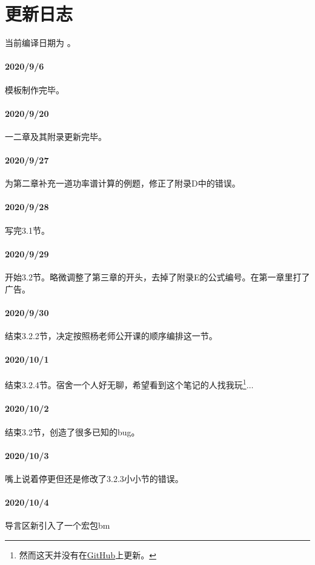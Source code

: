 \section{更新日志}
    当前编译日期为
    。
    \paragraph{2020/9/6}模板制作完毕。
    \paragraph{2020/9/20}一二章及其附录更新完毕。
    \paragraph{2020/9/27}为第二章补充一道功率谱计算的例题，修正了附录D中的错误。
    \paragraph{2020/9/28}写完3.1节。
    \paragraph{2020/9/29}开始3.2节。略微调整了第三章的开头，去掉了附录E的公式编号。在第一章里打了广告。
    \paragraph{2020/9/30}结束3.2.2节，决定按照杨老师公开课的顺序编排这一节。
    \paragraph{2020/10/1}结束3.2.4节。宿舍一个人好无聊，希望看到这个笔记的人找我玩\footnote{然而这天并没有在\href{https://github.com/phydx0803/BuptPoCNoteBook/}{GitHub}上更新。}$\ldots$
    \paragraph{2020/10/2}结束3.2节，创造了很多已知的bug。
    \paragraph{2020/10/3}嘴上说着停更但还是修改了3.2.3小小节的错误。
    \paragraph{2020/10/4}导言区新引入了一个宏包{\ttfamily bm}
